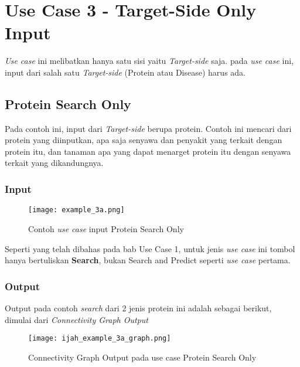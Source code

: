 \chapter{Use Case 3 - Target-Side Only Input}

\emph{Use case} ini melibatkan hanya satu sisi yaitu \emph{Target-side} saja. pada \emph{use case} ini, input dari salah satu \emph{Target-side} (Protein atau Disease) harus ada.

\section{Protein Search Only}

Pada contoh ini, input dari \emph{Target-side} berupa protein. Contoh ini mencari dari protein yang diinputkan, apa saja senyawa dan penyakit yang terkait dengan protein itu, dan tanaman apa yang dapat menarget protein itu dengan senyawa terkait yang dikandungnya.

\subsection{Input}
\begin{figure}[H]
	\centering
	\texttt{[image: example\_3a.png]}
	\caption{Contoh \emph{use case} input Protein Search Only}
	\label{fig:example_3a}
\end{figure}

Seperti yang telah dibahas pada bab Use Case 1, untuk jenis \emph{use case} ini tombol hanya bertuliskan \textbf{Search}, bukan Search and Predict seperti \emph{use case} pertama.

\subsection{Output}
Output pada contoh \emph{search} dari 2 jenis protein ini adalah sebagai berikut, dimulai dari \emph{Connectivity Graph Output}

\begin{figure}[H]
	\centering
	\texttt{[image: ijah\_example\_3a\_graph.png]}
	\caption{Connectivity Graph Output pada use case Protein Search Only}
	\label{fig:ijah_example_3a_output}
\end{figure}

